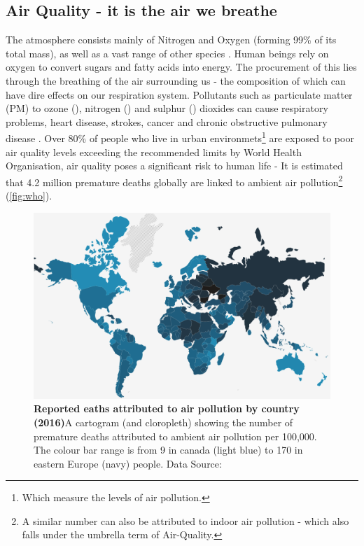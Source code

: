 \subsection{Air Quality - it is the air we breathe}\label{sec:airq}
The atmosphere consists mainly of Nitrogen and Oxygen (forming 99\% of its total mass), as well as a vast range of other species \citep{ac}. Human beings rely on oxygen to convert sugars and fatty acids into energy. The procurement of this lies through the breathing of the air surrounding us - the composition of which can have dire effects on our respiration system. Pollutants such as particulate matter (PM) to ozone (), nitrogen () and sulphur () dioxides can cause respiratory problems, heart disease, strokes, cancer and chronic obstructive pulmonary disease \cite{who}. Over 80\% of people who live in urban environmets\footnote{Which measure the levels of air pollution.} are exposed to poor air quality levels exceeding the recommended limits by World Health Organisation, air quality poses a significant risk to human life - It is estimated that 4.2 million premature deaths globally are linked to ambient air pollution\footnote{A similar number can also be attributed to indoor air pollution - which also falls under the umbrella term of Air-Quality.} (\autoref{fig:who}).


\begin{figure}[H]
  \centering
  \includegraphics[width=\textwidth]{who.png}
  \caption{\textbf{Reported eaths attributed to air pollution by country (2016)}A cartogram (and cloropleth) showing the number of premature deaths attributed to ambient air pollution per 100,000. The colour bar range is from 9 in canada (light blue) to 170 in eastern Europe (navy) people.  Data Source:\citep{whodata}}
  \label{fig:who}
\end{figure}

